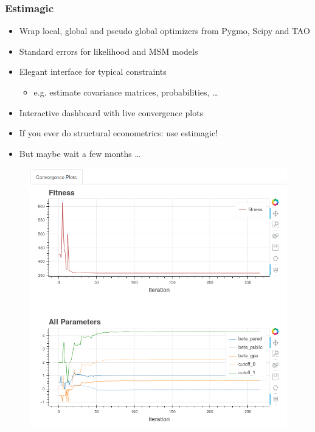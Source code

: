 \documentclass[11pt]{beamer}
\begin{document}
\begin{frame}[c]\frametitle{Estimagic}
    \begin{itemize}
        \item Wrap local, global and pseudo global optimizers from Pygmo, Scipy and TAO
        \item Standard errors for likelihood and MSM models
        \item Elegant interface for typical constraints
        \begin{itemize}
            \item e.g. estimate covariance matrices, probabilities, \ldots
        \end{itemize}
        \item Interactive dashboard with live convergence plots
        \item If you ever do structural econometrics: use estimagic!
        \item But maybe wait a few months \ldots
    \end{itemize}
\end{frame}



\begin{frame}[c]%
    \begin{figure}
        \includegraphics[height=\textheight]{figures/convergence_plot.png}
    \end{figure}
\end{frame}



\end{document}

